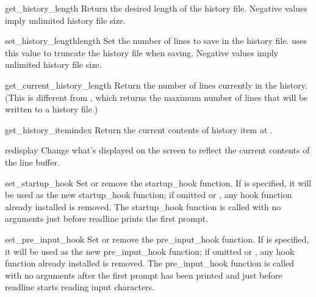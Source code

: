 \begin{funcdesc}{get_history_length}{}
Return the desired length of the history file.  Negative values imply
unlimited history file size.
\end{funcdesc}

\begin{funcdesc}{set_history_length}{length}
Set the number of lines to save in the history file.
 uses this value to truncate the
history file when saving.  Negative values imply unlimited history
file size.
\end{funcdesc}

\begin{funcdesc}{get_current_history_length}{}
Return the number of lines currently in the history.  (This is different
from , which returns the maximum number of
lines that will be written to a history file.)  
\end{funcdesc}

\begin{funcdesc}{get_history_item}{index}
Return the current contents of history item at .
\end{funcdesc}

\begin{funcdesc}{redisplay}{}
Change what's displayed on the screen to reflect the current contents
of the line buffer.  
\end{funcdesc}

\begin{funcdesc}{set_startup_hook}{}
Set or remove the startup_hook function.  If  is specified,
it will be used as the new startup_hook function; if omitted or
, any hook function already installed is removed.  The
startup_hook function is called with no arguments just
before readline prints the first prompt.
\end{funcdesc}

\begin{funcdesc}{set_pre_input_hook}{}
Set or remove the pre_input_hook function.  If  is specified,
it will be used as the new pre_input_hook function; if omitted or
, any hook function already installed is removed.  The
pre_input_hook function is called with no arguments after the first prompt
has been printed and just before readline starts reading input characters.
\end{funcdesc}

